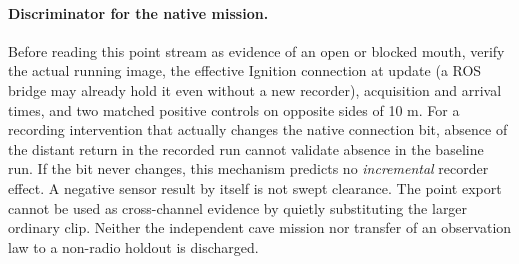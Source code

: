 \documentclass[11pt]{article}
\begin{document}
\paragraph{Discriminator for the native mission.}
Before reading this point stream as evidence of an open or blocked
mouth, verify the actual running image, the effective Ignition connection
at update (a ROS bridge may already hold it even without a new recorder),
acquisition and arrival times, and two matched positive controls on opposite
sides of 10 m. For a recording intervention that actually changes the
native connection bit, absence of the distant return in the recorded run
cannot validate absence in the baseline run. If the bit never changes, this
mechanism predicts no \emph{incremental} recorder effect. A negative sensor
result by itself is not swept clearance. The point export cannot be used
as cross-channel evidence by quietly substituting the larger ordinary
clip. Neither the independent cave mission nor transfer of an observation
law to a non-radio holdout is discharged.
\end{document}

